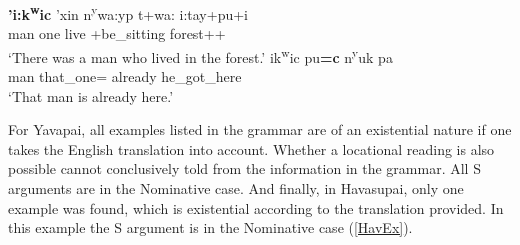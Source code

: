 
\begin{exe}\ex\label{DieExLoc}
\begin{xlist} 
\ex\gll \textbf{'i:k\textsuperscript{w}ic} 'xin n\textsuperscript{y}wa:yp t+wa: i:tay+pu+i\\
man one live \prog{}+be\_sitting forest+\dem{}+\loc{}\\
\glt `There was a man who lived in the forest.'
\ex\gll \textglotstop ik\textsuperscript{w}ic pu\textbf{=c} n\textsuperscript{y}uk pa\\
man that\_one=\nom{} already he\_got\_here\\
\glt `That man is already here.'
\end{xlist}
\end{exe}

For Yavapai, all examples listed in the grammar are of an existential nature if one takes the English translation into account. 
 Whether a locational reading is also possible cannot conclusively told from the information in the grammar. 
All S arguments are in the Nominative case. 
And finally, in Havasupai, only one example was found, which is existential according to the translation provided. 
In this example the S argument is in the Nominative case (\ref{HavEx}).

